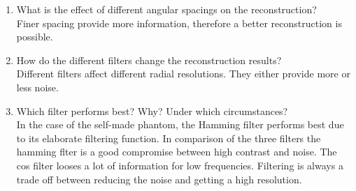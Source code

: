 \begin{enumerate}[label=(\alph*)]
    \item What is the effect of different angular spacings on the reconstruction?\\
    Finer spacing provide more information, therefore a better reconstruction is possible.
    \item How do the different filters change the reconstruction results?\\
    Different filters affect different radial resolutions. They either provide more or less noise.
    \item Which filter performs best? Why? Under which circumstances?\\
    In the case of the self-made phantom, the Hamming filter performs best due to its elaborate filtering function. In comparison of the three filters the hamming flter is a good compromise between high contrast and noise. The cos filter looses a lot of information for low frequencies. Filtering is always a trade off between reducing the noise and getting a high resolution.
\end{enumerate}

